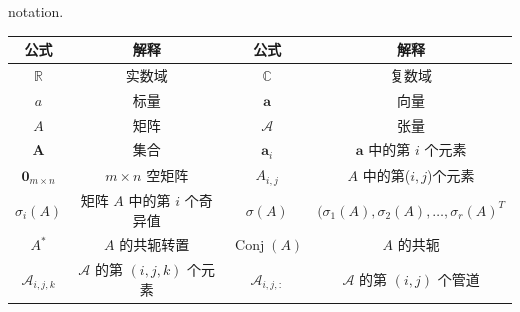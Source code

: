\begin{table}[]
	\centering
	{notation.}
	\label{tab:notation}
	\begin{tabular}{c c|c c}
		\toprule
		公式                                          & 解释                                                                                                                       & 公式                                      & 解释                                                      \\ \midrule[0.5pt]
		$\mathbb{R}$                                       & 实数域                                                                   &                    	$ \mathbb{C}  $                                    & 复数域         \\       
		     $ a $    &  标量  &	         $  \textbf{a} $                                    & 向量            \\  
		$A $                                     & 矩阵                 &       $ \mathcal{A} $                                & 张量 	                                 \\ 
		$\textbf{A} $                                   & 集合   &	$ \textbf{a}_i $                                   & $  \textbf{a} $ 中的第 $ i $ 个元素  \\ 
		$ \textbf{0}_{m\times n} $                         & $m\times n $ 空矩阵                                &          		$ A_{i,j} $                                        & $A$ 中的第($ i,j $)个元素                          \\    
		$ \sigma_i( A ) $                          & 
		矩阵 $ A $ 中的第 $ i $ 个奇异值	   &                             	$ \sigma(A) $                             & $ (\sigma_1( A ),\sigma_2( A ),\dots,\sigma_r( A )^T$                            \\  
		$ A^* $                                   & $ A $ 的共轭转置   &	$ \operatorname{Conj}(A) $                         & $A$ 的共轭        \\  
		
		$\mathcal{A}_{i, j, k}$                        & $ \mathcal{A}$ 的第 $ (i,j,k) $ 个元素                                                                 & $ \mathcal{A}_{i,j,:} $                        & $ \mathcal{A}$ 的第 $ (i,j) $ 个管道                                                 \\  
		

\end{tabular}
\end{table}
